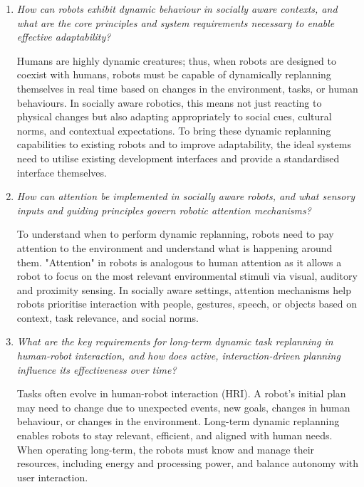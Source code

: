 \begin{enumerate}
    \item \textit{How can robots exhibit dynamic behaviour in socially aware contexts, and what are the core principles and system requirements necessary to enable effective adaptability?} 
    
    Humans are highly dynamic creatures; thus, when robots are designed to coexist with humans, robots must be capable of dynamically replanning themselves in real time based on changes in the environment, tasks, or human behaviours. In socially aware robotics, this means not just reacting to physical changes but also adapting appropriately to social cues, cultural norms, and contextual expectations. To bring these dynamic replanning capabilities to existing robots and to improve adaptability, the ideal systems need to utilise existing development interfaces and provide a standardised interface themselves.
    
    \item \textit{How can attention be implemented in socially aware robots, and what sensory inputs and guiding principles govern robotic attention mechanisms?}

    To understand when to perform dynamic replanning, robots need to pay attention to the environment and understand what is happening around them. "Attention" in robots is analogous to human attention as it allows a robot to focus on the most relevant environmental stimuli via visual, auditory and proximity sensing. In socially aware settings, attention mechanisms help robots prioritise interaction with people, gestures, speech, or objects based on context, task relevance, and social norms.
    
    \item \textit{What are the key requirements for long-term dynamic task replanning in human-robot interaction, and how does active, interaction-driven planning influence its effectiveness over time?}

    Tasks often evolve in human-robot interaction (HRI). A robot’s initial plan may need to change due to unexpected events, new goals, changes in human behaviour, or changes in the environment. Long-term dynamic replanning enables robots to stay relevant, efficient, and aligned with human needs. When operating long-term, the robots must know and manage their resources, including energy and processing power, and balance autonomy with user interaction.
    
\end{enumerate}
